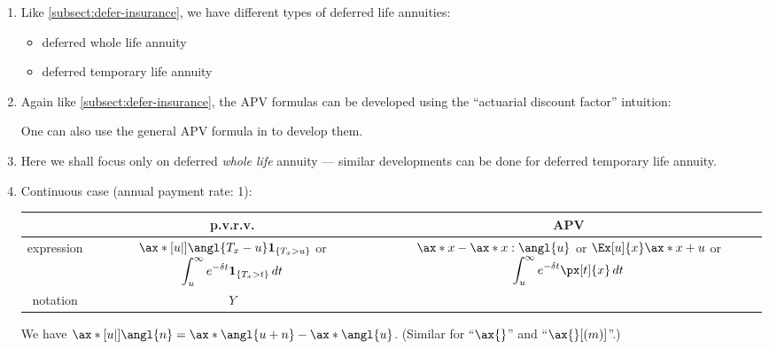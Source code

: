\begin{enumerate}
\item Like \cref{subsect:defer-insurance}, we have different types of deferred life annuities:
\begin{itemize}
\item deferred whole life annuity
\item deferred temporary life annuity
\end{itemize}
\item Again like \cref{subsect:defer-insurance}, the APV formulas can be
developed using the ``actuarial discount factor'' intuition:


One can also use the general APV formula in  to
develop them.
\item Here we shall focus only on deferred \emph{whole life} annuity ---
similar developments can be done for deferred temporary life annuity.
\item \label{it:cts-defer-wl-annuity-fmlas}
Continuous case (annual payment rate: 1):

\begin{tabular}{ccc}
\toprule
&p.v.r.v.&APV \\
\midrule
expression&\(\ax*[u|]{\angl{T_x-u}}\indicset{T_x>u}\) or \(\displaystyle\int_{u}^{\infty}e^{-\delta t}\mathbf{1}_{\left\{T_x>t\right\}}\,dt\)
&\makecell{\(\ax*{x}-\ax*{x:\angl{u}}\) or 
\(\Ex[u]{x}\ax*{x+u}\)\\
or \(\displaystyle\int_{u}^{\infty}e^{-\delta t}\px[t]{x}\,dt\)} \\
notation&\(Y\)&{\(\ax*[u|]{x}\)}\\
\bottomrule
\end{tabular}

\begin{note}
We have \(\ax*[u|]{\angl{n}}=\ax*{\angl{u+n}}-\ax*{\angl{u}}\). (Similar for
``\(\ax{}\)'' and ``\(\ax{}[(m)]\)''.)
\end{note}


\end{enumerate}

